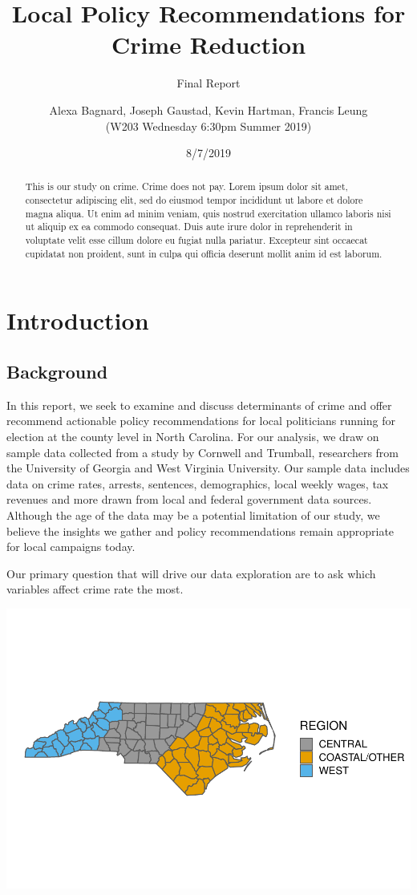 \documentclass[]{article}
\title{Local Policy Recommendations for Crime Reduction}
\subtitle{Final Report}
\author{Alexa Bagnard, Joseph Gaustad, Kevin Hartman, Francis Leung \\ (W203 Wednesday 6:30pm Summer 2019)}
\date{8/7/2019}
\begin{document}
\maketitle
\begin{abstract}
This is our study on crime. Crime does not pay. Lorem ipsum dolor sit
amet, consectetur adipiscing elit, sed do eiusmod tempor incididunt ut
labore et dolore magna aliqua. Ut enim ad minim veniam, quis nostrud
exercitation ullamco laboris nisi ut aliquip ex ea commodo consequat.
Duis aute irure dolor in reprehenderit in voluptate velit esse cillum
dolore eu fugiat nulla pariatur. Excepteur sint occaecat cupidatat non
proident, sunt in culpa qui officia deserunt mollit anim id est laborum.
\end{abstract}

{
\setcounter{tocdepth}{2}
\tableofcontents
}
\hypertarget{introduction}{%
\section{Introduction}\label{introduction}}

\hypertarget{background}{%
\subsection{Background}\label{background}}

In this report, we seek to examine and discuss determinants of crime and
offer recommend actionable policy recommendations for local politicians
running for election at the county level in North Carolina. For our
analysis, we draw on sample data collected from a study by Cornwell and
Trumball, researchers from the University of Georgia and West Virginia
University. Our sample data includes data on crime rates, arrests,
sentences, demographics, local weekly wages, tax revenues and more drawn
from local and federal government data sources. Although the age of the
data may be a potential limitation of our study, we believe the insights
we gather and policy recommendations remain appropriate for local
campaigns today.

Our primary question that will drive our data exploration are to ask
which variables affect crime rate the most.

\includegraphics{Bagnard_Gaustad_Hartman_Leung_Lab_3_files/figure-latex/unnamed-chunk-1-1.pdf}
\end{document}
